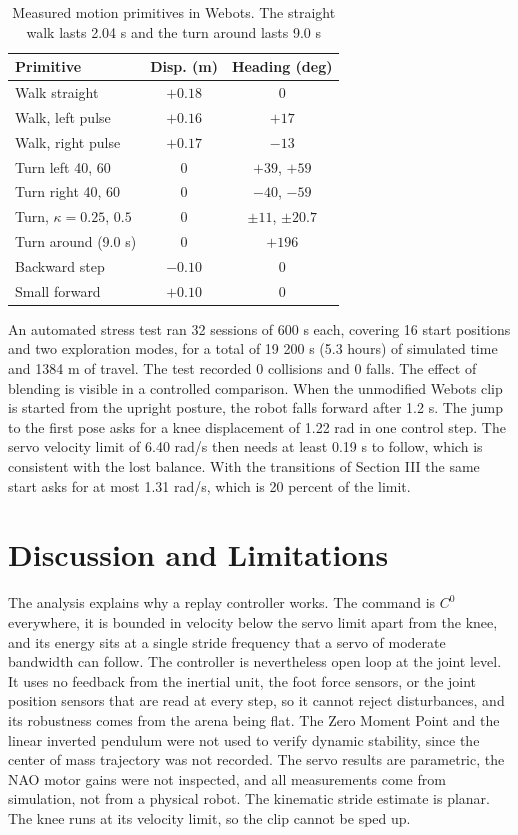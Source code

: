 \documentclass[10pt,journal]{IEEEtran}
\begin{document}
\begin{table}[t]
\centering
\caption{Measured motion primitives in Webots. The straight walk lasts 2.04 s and the turn around lasts 9.0 s}
\label{tab:meas}
\small
\begin{tabular}{lcc}
\toprule
Primitive & Disp. (m) & Heading (deg)\\
\midrule
Walk straight & $+0.18$ & 0\\
Walk, left pulse & $+0.16$ & $+17$\\
Walk, right pulse & $+0.17$ & $-13$\\
Turn left 40, 60 & 0 & $+39$, $+59$\\
Turn right 40, 60 & 0 & $-40$, $-59$\\
Turn, $\kappa=0.25$, $0.5$ & 0 & $\pm11$, $\pm20.7$\\
Turn around (9.0 s) & 0 & $+196$\\
Backward step & $-0.10$ & 0\\
Small forward & $+0.10$ & 0\\
\bottomrule
\end{tabular}
\end{table}

An automated stress test ran 32 sessions of 600 s each, covering 16 start positions and two exploration modes, for a total of 19 200 s (5.3 hours) of simulated time and 1384 m of travel. The test recorded 0 collisions and 0 falls. The effect of blending is visible in a controlled comparison. When the unmodified Webots clip is started from the upright posture, the robot falls forward after 1.2 s. The jump to the first pose asks for a knee displacement of 1.22 rad in one control step. The servo velocity limit of 6.40 rad/s then needs at least 0.19 s to follow, which is consistent with the lost balance. With the transitions of Section III the same start asks for at most 1.31 rad/s, which is 20 percent of the limit.

\section{Discussion and Limitations}
The analysis explains why a replay controller works. The command is $C^0$ everywhere, it is bounded in velocity below the servo limit apart from the knee, and its energy sits at a single stride frequency that a servo of moderate bandwidth can follow. The controller is nevertheless open loop at the joint level. It uses no feedback from the inertial unit, the foot force sensors, or the joint position sensors that are read at every step, so it cannot reject disturbances, and its robustness comes from the arena being flat. The Zero Moment Point and the linear inverted pendulum \cite{kajita2003,kajita2010} were not used to verify dynamic stability, since the center of mass trajectory was not recorded. The servo results are parametric, the NAO motor gains were not inspected, and all measurements come from simulation, not from a physical robot. The kinematic stride estimate is planar. The knee runs at its velocity limit, so the clip cannot be sped up.
\end{document}
